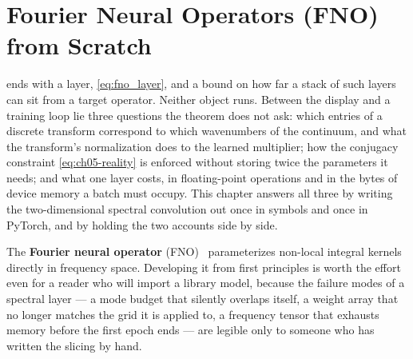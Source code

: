 
\chapter{Fourier Neural Operators (FNO) from Scratch}
\label{ch:part2-fourier-neural-operators-fno-from-scratch}
\label{sec:fno_impl}

 ends with a layer,
\eqref{eq:fno_layer}, and a bound on how far a stack of such layers can sit from
a target operator. Neither object runs. Between the display and a training loop
lie three questions the theorem does not ask: which entries of a discrete
transform correspond to which wavenumbers of the continuum, and what the
transform's normalization does to the learned multiplier; how the conjugacy
constraint \eqref{eq:ch05-reality} is enforced without storing twice the
parameters it needs; and what one layer costs, in floating-point operations and
in the bytes of device memory a batch must occupy. This chapter answers all
three by writing the two-dimensional spectral convolution out once in symbols
and once in PyTorch, and by holding the two accounts side by side.

The \textbf{Fourier neural operator} (FNO)~\cite{li2021fourier} parameterizes
non-local integral kernels directly in frequency space.
Developing it from first principles is worth the effort even for a reader who
will import a library model, because the failure modes of a spectral layer --- a
mode budget that silently overlaps itself, a weight array that no longer matches
the grid it is applied to, a frequency tensor that exhausts memory before the
first epoch ends --- are legible only to someone who has written the slicing by
hand.

